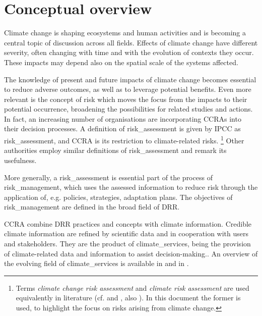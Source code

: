 \section{Conceptual overview}
\label{sec:Conceptual overview}
Climate change is shaping ecosystems and human activities and is becoming a central topic of discussion across all fields.\cite{2022PortnerClimateChange,2022PortnerTechnicalSummary} Effects of climate change have different severity, often changing with time and with the evolution of contexts they occur.\cite{2024EEAExecutiveSummary} These impacts may depend also on the spatial scale of the systems affected.\cite{2021Doblas-ReyesLinkingGlobal}

The knowledge of present and future impacts of climate change becomes essential to reduce adverse outcomes, as well as to leverage potential benefits. Even more relevant is the concept of risk which moves the focus from the impacts to their potential occurrence, broadening the possibilities for related studies and actions.
In fact, an increasing number of organisations are incorporating \glspl{CCRA} into their decision processes.\cite{2024Carlin2024Climate} A definition of \gls{risk_assessment} is given by \gls{IPCC} as \glsdesc{risk_assessment}, and \gls{CCRA} is its restriction to climate-related \glspl{risk}.%
\footnote{Terms \emph{climate change risk assessment} and \emph{climate risk assessment} are used equivalently in literature (cf. \cite[11]{2017GIZRiskSupplement} and \cite[20]{2017GIZTheVulnerability}, also \cite{2024LoyerInventoryOf}). In this document the former is used, to highlight the focus on risks arising from climate change.}
Other authorities employ similar definitions of \gls{risk_assessment} and remark its usefulness.\cite{2021ISO14091,2019UNDRRGlobalAssessment}

More generally, a \gls{risk_assessment} is essential part of the process of \gls{risk_management}, which uses the assessed information to reduce risk through the application of, e.g. policies, strategies, adaptation plans.\cite{2018ISO31000} The objectives of \gls{risk_management} are defined in the broad field of \gls{DRR}.\cite{2016UNSecretary-GeneralReportOf}

\Gls{CCRA} combine \gls{DRR} practices and concepts with climate information.\cite{2017GIZRiskSupplement,2012FieldManagingThe} Credible climate information are refined by scientific data and in cooperation with users and stakeholders. They are the product of \glspl{climate_service}, being the provision of climate-related data and information to assist decision-making.\cite{2012HewittTheGlobal}. An overview of the evolving field of \glspl{climate_service} is available in \cite[1431-1433]{2021Doblas-ReyesLinkingGlobal} and in \cite[1862-1869]{2021RanasingheClimateChange}.

